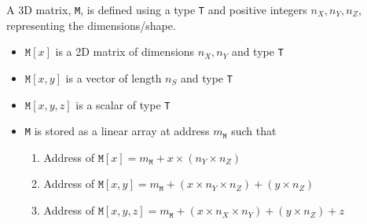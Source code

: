 \begin{definition}
  \label{3D_matrix}
  A 3D matrix, {\tt M}, is defined using a type {\tt T} and positive integers 
\(n_X, n_Y, n_Z\), representing the dimensions/shape.
\begin{itemize}
  \item \(\mathtt{M}[x]\) is a 2D matrix of dimensions \(n_X, n_Y\) and type
    {\tt T}
  \item \(\mathtt{M}[x, y]\) is a vector of length \(n_S\) and type {\tt T}
\item \(\mathtt{M}[x, y, z]\) is a scalar of type {\tt T}
\item {\tt M} is stored as a linear array at address \(m_{\mathtt{M}}\)
  such that 
    \begin{enumerate} 
    \item Address of \(\mathtt{M}[x] = 
  m_{\mathtt{M}} + x \times (n_Y \times n_Z)\)
\item Address of \(\mathtt{M}[x, y]  = 
  m_{\mathtt{M}} + (x \times n_Y \times n_Z) + (y \times n_Z)\)
\item Address of \(\mathtt{M}[x, y, z] = 
  m_{\mathtt{M}} + (x \times n_X \times n_Y) + (y \times n_Z) + z\)
\end{enumerate}
\end{itemize}
\end{definition}

